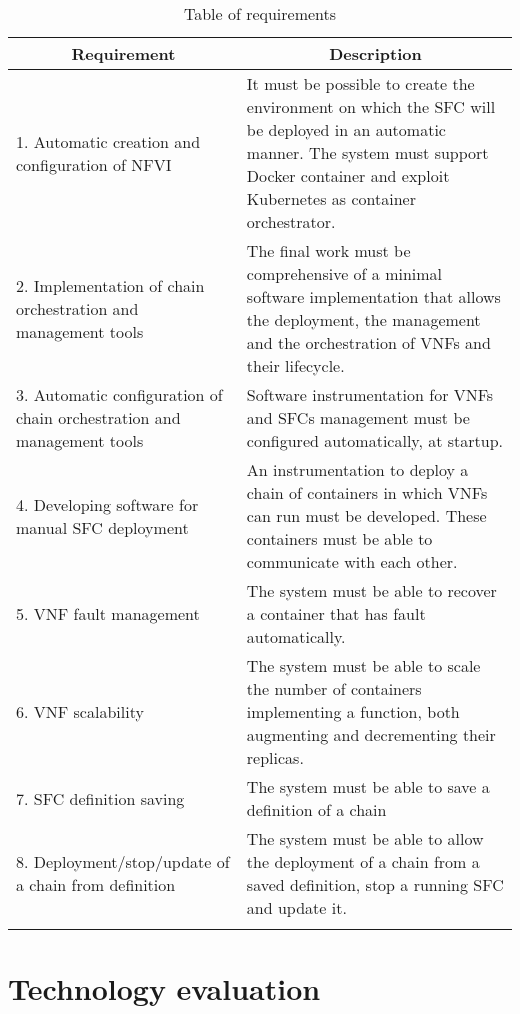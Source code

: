 \begin{longtable}[c]{p{}p{}}
\hline
\multicolumn{1}{c}{\textbf{Requirement}}                                & \multicolumn{1}{c}{\textbf{Description}}                                                                                                                                                       \\ \hline
\endhead
%
\hline
\endfoot
%
\endlastfoot
%
1. Automatic creation and configuration of NFVI &
It must be possible to create the environment on which the SFC will be deployed
in an automatic manner. The system must support Docker container and exploit
Kubernetes as container orchestrator. \\
2. Implementation of chain orchestration and management tools &
The final work must be comprehensive of a minimal software implementation that
allows the deployment, the management and the orchestration of VNFs and their
lifecycle. \\
3. Automatic configuration of chain orchestration and management tools &
Software instrumentation for VNFs and SFCs management must be configured
automatically, at startup. \\
4. Developing software for manual SFC deployment &
An instrumentation to deploy a chain of containers in which VNFs can run must
be developed. These containers must be able to communicate with each
other. \\
5. VNF fault management &
The system must be able to recover a container that has fault automatically. \\
6. VNF scalability &
The system must be able to scale the number of containers implementing a
function, both augmenting and decrementing their replicas. \\
7. SFC definition saving &
The system must be able to save a definition of a chain \\
8. Deployment/stop/update of a chain from definition &
The system must be able to allow the deployment of a chain from a saved
definition, stop a running SFC and update it. \\
\hline
\caption{Table of requirements}
\label{chap:prjan:tab:req}\\
\end{longtable}

\section{Technology evaluation}

